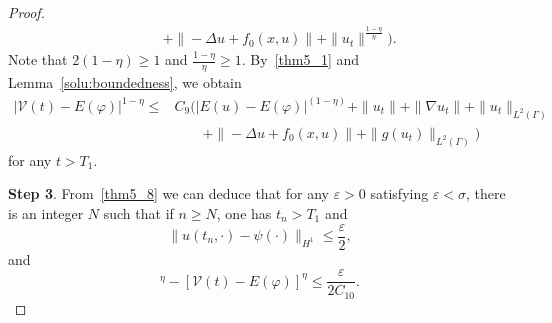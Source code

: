 \documentclass{elsarticle}
\begin{document}
\begin{proof}
\begin{equation*}
\begin{split}
&\qquad +\|-\Delta u+f_0(x, u)\| +  \|u_{t}\|^{\frac{1-\eta}{\eta}} \Big).
\end{split}
\end{equation*}
Note that $2(1-\eta) \geqslant 1$ and $\frac{1-\eta}{\eta} \geqslant 1$. By~\eqref{thm5_1} and Lemma~\ref{solu:boundedness}, we obtain
\begin{equation}\label{thm5_9}
\begin{split}
|\mathcal{V}(t) - E(\varphi) |^{1-\eta}\leqslant &C_9\Big(|E(u) - E(\varphi)|^{(1-\eta)} + \|u_t\| + \|\nabla u_t\| + \|u_{t}\|_{L^2(\Gamma)}\\
&\qquad+\|-\Delta u+f_0(x, u)\| + \|g(u_{t})\|_{L^2(\Gamma)} \Big)
\end{split}
\end{equation}
for any $t>T_1$.

\textbf{Step 3}. From~\eqref{thm5_8} we can deduce that for any $\varepsilon>0$ satisfying $\varepsilon < \sigma$, there is an integer $N$ such that if $n \geq N$, one has $t_n>T_1$ and
\begin{equation}
	\| u(t_{n}, \cdot) - \psi(\cdot)\|_{H^1} \leq \frac{\varepsilon}{2}, \label{thm5_10}
\end{equation}
and
\begin{equation}
	[\mathcal{V}(t_n)-E(\varphi)]^{\eta} -[\mathcal{V}(t)-E(\varphi)]^{\eta}\leq \frac{\varepsilon}{2C_{10}}. \label{thm5_10}
\end{equation}


\end{proof}
\end{document}
